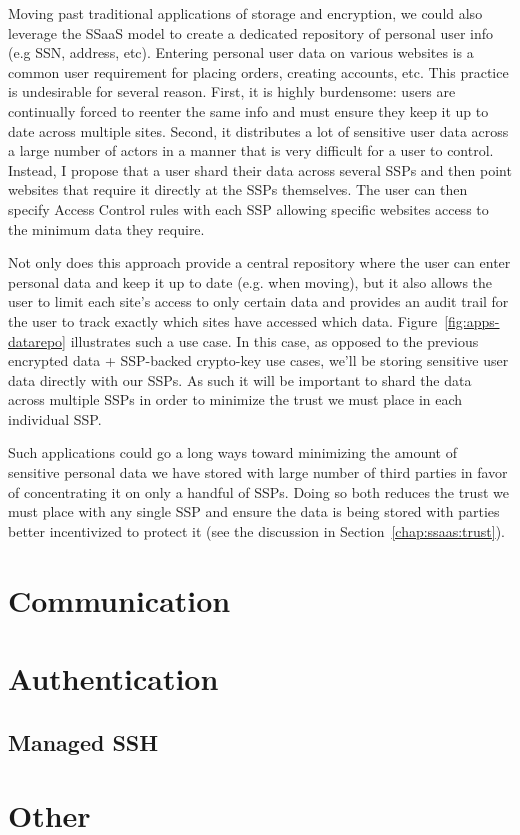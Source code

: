 Moving past traditional applications of storage and encryption, we
could also leverage the SSaaS model to create a dedicated repository
of personal user info (e.g SSN, address, etc). Entering personal user
data on various websites is a common user requirement for placing
orders, creating accounts, etc. This practice is undesirable for
several reason. First, it is highly burdensome: users are continually
forced to reenter the same info and must ensure they keep it up to
date across multiple sites. Second, it distributes a lot of sensitive
user data across a large number of actors in a manner that is very
difficult for a user to control. Instead, I propose that a user shard
their data across several SSPs and then point websites that require it
directly at the SSPs themselves. The user can then specify Access
Control rules with each SSP allowing specific websites access to the
minimum data they require.

Not only does this approach provide a central repository where the
user can enter personal data and keep it up to date (e.g. when
moving), but it also allows the user to limit each site's access to
only certain data and provides an audit trail for the user to track
exactly which sites have accessed which
data. Figure~\ref{fig:apps-datarepo} illustrates such a use case. In
this case, as opposed to the previous encrypted data + SSP-backed
crypto-key use cases, we'll be storing sensitive user data directly
with our SSPs. As such it will be important to shard the data across
multiple SSPs in order to minimize the trust we must place in each
individual SSP.

Such applications could go a long ways toward minimizing the amount of
sensitive personal data we have stored with large number of third
parties in favor of concentrating it on only a handful of SSPs. Doing
so both reduces the trust we must place with any single SSP and ensure
the data is being stored with parties better incentivized to protect
it (see the discussion in Section~\ref{chap:ssaas:trust}).

\section{Communication}



\section{Authentication}

\subsection{Managed SSH}


\section{Other}

